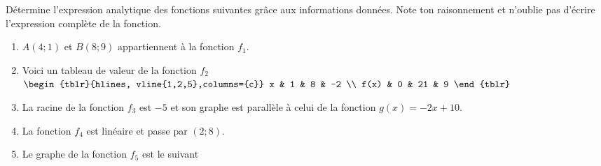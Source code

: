 \documentclass[a4paper, 12pt, parskip=half-]{scrartcl}
\begin{document}
\begin{exercise}[points=10]
    Détermine l'expression analytique des fonctions suivantes grâce aux informations données. Note ton raisonnement et n'oublie pas d'écrire l'expression complète de la fonction.
    \begin{enumerate}[itemsep=2em]
        \item
              $A(4;1)$ et $B(8;9)$ appartiennent à la fonction $f_1$.
        \item
              Voici un tableau de valeur de la fonction $f_2$
              \hfil
              $\begin{tblr}{hlines, vline{1,2,5},columns={c}}
                      x    & 1 & 8   & -2  \\
                      f(x) & 0 & 21 & 9
                  \end{tblr}$
        \item
              La racine de la fonction $f_3$ est $-5$ et son graphe est parallèle à celui de la fonction $g(x)=-2x + 10$.
        \item
              La fonction $f_4$ est linéaire et passe par $(2;8)$.
        \item
              Le graphe de la fonction $f_5$ est le suivant\hfil 
    \end{enumerate}
\end{exercise}
\end{document}
